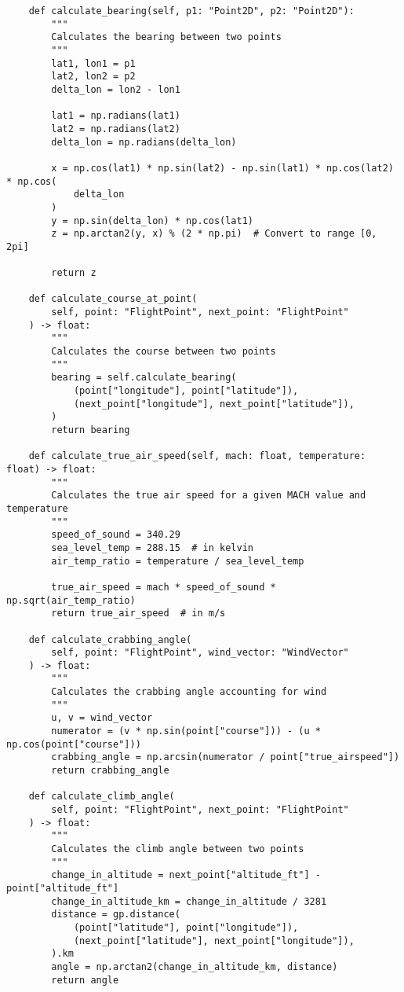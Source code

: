 \begin{verbatim}
    def calculate_bearing(self, p1: "Point2D", p2: "Point2D"):
        """
        Calculates the bearing between two points
        """
        lat1, lon1 = p1
        lat2, lon2 = p2
        delta_lon = lon2 - lon1

        lat1 = np.radians(lat1)
        lat2 = np.radians(lat2)
        delta_lon = np.radians(delta_lon)

        x = np.cos(lat1) * np.sin(lat2) - np.sin(lat1) * np.cos(lat2) * np.cos(
            delta_lon
        )
        y = np.sin(delta_lon) * np.cos(lat1)
        z = np.arctan2(y, x) % (2 * np.pi)  # Convert to range [0, 2pi]

        return z

    def calculate_course_at_point(
        self, point: "FlightPoint", next_point: "FlightPoint"
    ) -> float:
        """
        Calculates the course between two points
        """
        bearing = self.calculate_bearing(
            (point["longitude"], point["latitude"]),
            (next_point["longitude"], next_point["latitude"]),
        )
        return bearing

    def calculate_true_air_speed(self, mach: float, temperature: float) -> float:
        """
        Calculates the true air speed for a given MACH value and temperature
        """
        speed_of_sound = 340.29
        sea_level_temp = 288.15  # in kelvin
        air_temp_ratio = temperature / sea_level_temp

        true_air_speed = mach * speed_of_sound * np.sqrt(air_temp_ratio)
        return true_air_speed  # in m/s

    def calculate_crabbing_angle(
        self, point: "FlightPoint", wind_vector: "WindVector"
    ) -> float:
        """
        Calculates the crabbing angle accounting for wind
        """
        u, v = wind_vector
        numerator = (v * np.sin(point["course"])) - (u * np.cos(point["course"]))
        crabbing_angle = np.arcsin(numerator / point["true_airspeed"])
        return crabbing_angle

    def calculate_climb_angle(
        self, point: "FlightPoint", next_point: "FlightPoint"
    ) -> float:
        """
        Calculates the climb angle between two points
        """
        change_in_altitude = next_point["altitude_ft"] - point["altitude_ft"]
        change_in_altitude_km = change_in_altitude / 3281
        distance = gp.distance(
            (point["latitude"], point["longitude"]),
            (next_point["latitude"], next_point["longitude"]),
        ).km
        angle = np.arctan2(change_in_altitude_km, distance)
        return angle


\end{verbatim}
